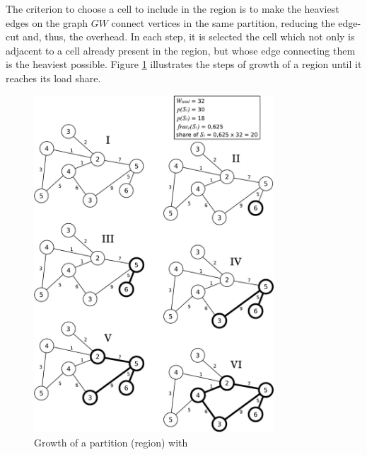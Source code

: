 

The criterion to choose a cell to include in the region is to make the heaviest edges on the graph $GW$ connect vertices in the same partition, reducing the edge-cut and, thus, the overhead. In each step, it is selected the cell which not only is adjacent to a cell already present in the region, but whose edge connecting them is the heaviest possible. Figure \ref{fig:ggp} illustrates the steps of growth of a region until it reaches its load share.

\begin{figure}
\centering
\includegraphics[width=0.8\textwidth]{images/ggp}
\caption{Growth of a partition (region) with \ggp}
\label{fig:ggp}
\end{figure}

